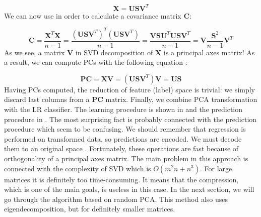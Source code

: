 \begin{equation}\label{eq:pca2}
    \boldsymbol{X}=\boldsymbol{U}\boldsymbol{S}\boldsymbol{V}^{T}
\end{equation}
We can now use  in order to calculate a covariance matrix $\boldsymbol{C}$:

\begin{equation}\label{eq:pca3}
    \boldsymbol{C}=\frac{\boldsymbol{X}^T\boldsymbol{X}}{n-1} = \frac{(\boldsymbol{U}\boldsymbol{S}\boldsymbol{V}^T)^T(\boldsymbol{U}\boldsymbol{S}\boldsymbol{V}^T)}{n-1} = \frac{\boldsymbol{V}\boldsymbol{S}\boldsymbol{U}^T\boldsymbol{U}\boldsymbol{S}\boldsymbol{V}^T}{n-1} = \boldsymbol{V}\frac{\boldsymbol{S}^{2}}{n-1}\boldsymbol{V}^{T} 
\end{equation}
As we see, a matrix $\boldsymbol{V}$ in SVD decomposition of $\boldsymbol{X}$ is a principal axes matrix! As a result, we can compute PCs with the following equation \citep{Jolliffe}: 

\begin{equation}\label{eq:pca4}
    \boldsymbol{PC} = \boldsymbol{X}\boldsymbol{V} = (\boldsymbol{U}\boldsymbol{S}\boldsymbol{V}^{T})\boldsymbol{V} = \boldsymbol{U}\boldsymbol{S}
\end{equation}
Having PCs computed, the reduction of feature (label) space is trivial: we simply discard last columns from a $\boldsymbol{PC}$ matrix.  
Finally, we combine PCA transformation with the LR classifier. The learning procedure is shown in  and the prediction procedure in . The most surprising fact is probably connected with the prediction procedure which seem to be confusing. We should remember that regression is performed on transformed data, so predictions are encoded. We must decode them to an original space \citep{PLST}. Fortunately, these operations are fast because of orthogonality of a principal axes matrix. The main problem in this approach is connected with the complexity of SVD which is $O(m^2n+n^3)$. For large matrices it is definitely too time-consuming. It means that the compression, which is one of the main goals, is useless in this case. In the next section, we will go through the algorithm based on random PCA. This method also uses eigendecomposition, but for definitely smaller matrices.

